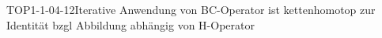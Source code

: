 
\begin{PROP}{TOP1-1-04-12}{Iterative Anwendung von BC-Operator ist kettenhomotop zur Identität bzgl Abbildung abhängig von H-Operator}
\end{PROP}
